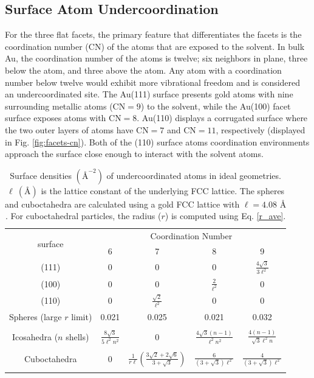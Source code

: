 \subsection{Surface Atom Undercoordination}
For the three flat facets, the primary feature that differentiates the
facets is the coordination number (CN) of the atoms that are exposed
to the solvent. In bulk Au, the coordination number of the atoms is
twelve; six neighbors in plane, three below the atom, and three above the
atom. Any atom with a coordination number below twelve would exhibit more
vibrational freedom and is considered an undercoordinated site. The
Au(111) surface presents gold atoms with nine surrounding metallic
atoms ($\text{CN} = 9$) to the solvent, while the Au(100) facet
surface exposes atoms with $\text{CN}=8$.  Au(110) displays a
corrugated surface where the two outer layers of atoms have
$\text{CN}=7$ and $\text{CN}=11$, respectively (displayed in Fig. \ref{fig:facets-cn}).
Both of the (110) surface atoms coordination environments
approach the surface close enough to interact with the solvent atoms.

\begin{table}
\centering
\caption{Surface densities $(\text{\AA}^{-2})$ of undercoordinated
  atoms in ideal geometries. $\ell~(\text{\AA})$ is the
  lattice constant of the underlying FCC lattice.  The spheres and
  cuboctahedra are calculated using a gold FCC lattice with $\ell = 4.08
  \text{~\AA}$.  For cuboctahedral particles, the radius ($r$) is computed
  using Eq. \eqref{r_ave}.
  \label{tab:undercoord}}
\begin{tabular}{ c|cccc }
\toprule
\multirow{2}{*}{surface} & \multicolumn{4}{c}{Coordination Number}\\
        & 6 & 7 & 8 & 9 \\
 \midrule
(111)      & 0 & 0     & 0     & $\frac{4 \sqrt{3}}{3 \ell^2}$ \\
(100)      & 0 & 0     & $\frac{2}{\ell^2}$ & 0     \\
(110)      & 0 & $\frac{\sqrt{2}}{\ell^2}$ & 0     & 0     \\
 \midrule
Spheres (large $r$ limit)    & 0.021 & 0.025 & 0.021 & 0.032\\ \\
Icosahedra ($n$ shells)  & $\frac{8\sqrt{3}}{5\ell^2n^2}$  &  0 &
 $\frac{4\sqrt{3}(n-1)}{\ell^2n^2}$ &
 $\frac{4(n - 1)}{\sqrt{3}\ell^2 n}$ \\ \\
Cuboctahedra & 0 & $\frac{1}{r\ell} \left(\frac{3\sqrt{2} + 2\sqrt{6}}{3+\sqrt{3}}\right)$ & $\frac{6}{(3+\sqrt{3})\ell^2}$ & $\frac{4}{(3+\sqrt{3})\ell^2}$\\ \\
\bottomrule
\end{tabular}
\end{table}

